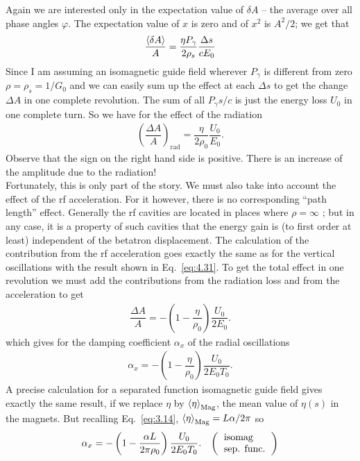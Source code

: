 Again we are interested only in the expectation value of $\delta A$ -- the average over all
phase angles $\varphi$. The expectation value of $x$ is zero and of $x^2$ is $A^2/2$; we get that
\begin{align}
	\dfrac{\left< \delta A \right>}{A} = \dfrac{\eta P_\gamma}{2 \rho_s} \dfrac{\Delta s}{cE_0}
\end{align}
Since I am assuming an isomagnetic guide field wherever $P_\gamma$ is different from zero $\rho = \rho_s = 1/G_0$ and we can easily sum up the effect at each $\Delta s$ to get the change $\Delta A$ in one complete revolution. The sum of all $P_\gamma s/c$ is just the energy loss $U_0$ in one complete turn. So we have for the effect of the radiation
\begin{align}
	\left( \dfrac{\Delta A}{A} \right)_\text{rad} = \dfrac{\eta}{2\rho_0}\dfrac{U_0}{E_0}.
\end{align}
Observe that the sign on the right hand side is positive. There is an increase of the amplitude
 due to the radiation!\\
Fortunately, this is only part of the story. We must also take into account the effect of the rf acceleration. For it however, there is no corresponding ``path length'' effect. Generally the rf cavities are located in places where $\rho = \infty$ ; but in any case, it is a property of such cavities that the energy gain is (to first order at least) independent of the betatron displacement. The calculation of the contribution from the rf acceleration goes exactly the same as for the vertical oscillations with the result shown in Eq.~\eqref{eq:4.31}. To get the total effect in one revolution we must add the contributions from the radiation loss and from the acceleration to get
\begin{align}
	\dfrac{\Delta A}{A} = - \left(1 - \dfrac{\eta}{\rho_0} \right) \dfrac{U_0}{2 E_0}.
\end{align}
which gives for the damping coefficient $\alpha_x$ of the radial oscillations
\begin{align}\label{eq:4.48}
	\alpha_x = - \left(1 - \dfrac{\eta}{\rho_0} \right) \dfrac{U_0}{2 E_0 T_0}.
\end{align}
A precise calculation for a separated function isomagnetic guide field gives exactly the same result, if we replace $\eta$ by $\left< \eta \right>_\text{Mag}$, the mean value of $\eta(s)$ in the magnets. But recalling Eq.~\eqref{eq:3.14}, $\left< \eta \right>_\text{Mag} = L\alpha/2\pi$ so
\begin{align} \label{eq:4.49}
	\alpha_x = - \left(1 - \dfrac{\alpha L}{2\pi\rho_0} \right) \dfrac{U_0}{2 E_0 T_0}. && \left(\begin{tabular}{l}
\text{isomag} \\
\text{sep. func.}
\end{tabular}\right)
\end{align}
